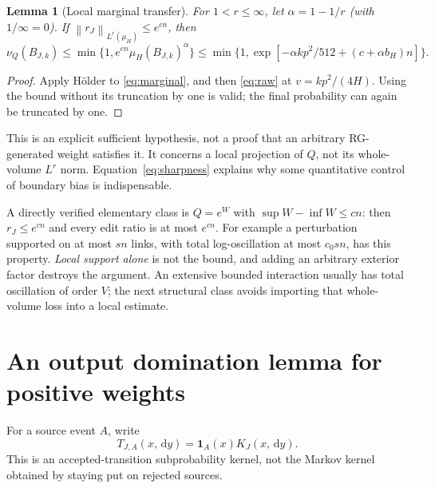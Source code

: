 \documentclass[11pt]{article}
\newtheorem{lemma}[theorem]{Lemma}
\theoremstyle{definition}
\theoremstyle{remark}
\newcommand{\one}{\mathbf 1}
\newcommand{\dd}{\,\mathrm d}
\newcommand{\norm}[1]{\left\lVert#1\right\rVert}
\begin{document}
\begin{lemma}[Local marginal transfer]\label{lem:holder}
For $1<r\le\infty$, let $\alpha=1-1/r$ (with $1/\infty=0$). If
$\norm{r_J}_{L^r(\mu_H)}\le e^{c n}$, then
\begin{equation}
 \nu_Q(B_{J,k})\le
 \min\{1,e^{cn}\mu_H(B_{J,k})^\alpha\}
 \le\min\{1,\exp[-\alpha kp^2/512+(c+\alpha b_H)n]\}.
 \label{eq:holder}
\end{equation}
\end{lemma}
\begin{proof}
Apply H\"older to \eqref{eq:marginal}, and then \eqref{eq:raw} at
$v=kp^2/(4H)$. Using the bound without its truncation by one is valid;
the final probability can again be truncated by one.
\end{proof}
This is an explicit sufficient hypothesis, not a proof that an arbitrary
RG-generated weight satisfies it. It concerns a local projection of $Q$,
not its whole-volume $L^r$ norm. Equation~\eqref{eq:sharpness} explains
why some quantitative control of boundary bias is indispensable.

A directly verified elementary class is $Q=e^W$ with
$\sup W-\inf W\le c n$: then $r_J\le e^{cn}$ and every edit ratio is at
most $e^{cn}$. For example a perturbation supported on at most $s n$
links, with total log-oscillation at most $c_0s n$, has this property.
\emph{Local support alone} is not the bound, and adding an arbitrary
exterior factor destroys the argument. An extensive bounded interaction
usually has total oscillation of order $V$; the next structural class
avoids importing that whole-volume loss into a local estimate.

\section{An output domination lemma for positive weights}
For a source event $A$, write
\[
 T_{J,A}(x,\dd y)=\one_A(x)K_J(x,\dd y).
\]
This is an accepted-transition subprobability kernel, not the Markov
kernel obtained by staying put on rejected sources.
\end{document}
